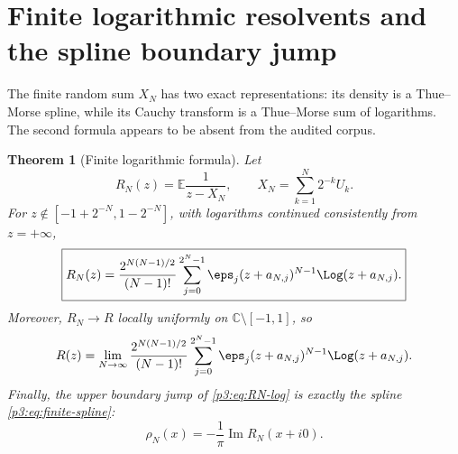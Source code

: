 \documentclass[11pt,oneside]{article}
\newtheorem{theorem}{Theorem}[section]
\theoremstyle{definition}
\newcommand{\E}{\mathbb E}
\newcommand{\C}{\mathbb C}
\begin{document}
\section{Finite logarithmic resolvents and the spline boundary jump}

The finite random sum \(X_N\) has two exact representations: its density is a
Thue--Morse spline, while its Cauchy transform is a Thue--Morse sum of logarithms.  The
second formula appears to be absent from the audited corpus.

\begin{theorem}[Finite logarithmic formula]\label{p3:thm:finite-log}
Let
\[
 R_N(z)=\E\frac1{z-X_N},
 \qquad X_N=\sum_{k=1}^{N}2^{-k}U_k.
\]
For \(z\notin[-1+2^{-N},1-2^{-N}]\), with logarithms continued consistently from
\(z=+\infty\),
\begin{equation}
 \boxed{
 R_N(z)=\frac{2^{N(N-1)/2}}{(N-1)!}
 \sum_{j=0}^{2^N-1}\eps_j
 (z+a_{N,j})^{N-1}\Log(z+a_{N,j}).
 }                                                           \label{p3:eq:RN-log}
\end{equation}
Moreover, \(R_N\to R\) locally uniformly on \(\C\setminus[-1,1]\), so
\begin{equation}
 R(z)=\lim_{N\to\infty}\frac{2^{N(N-1)/2}}{(N-1)!}
 \sum_{j=0}^{2^N-1}\eps_j
 (z+a_{N,j})^{N-1}\Log(z+a_{N,j}).                           \label{p3:eq:R-log-limit}
\end{equation}
Finally, the upper boundary jump of \eqref{p3:eq:RN-log} is exactly the spline
\eqref{p3:eq:finite-spline}:
\begin{equation}
 \rho_N(x)=-\frac1\pi\operatorname{Im}R_N(x+i0).
                                                                    \label{p3:eq:RN-boundary}
\end{equation}
\end{theorem}
\end{document}
